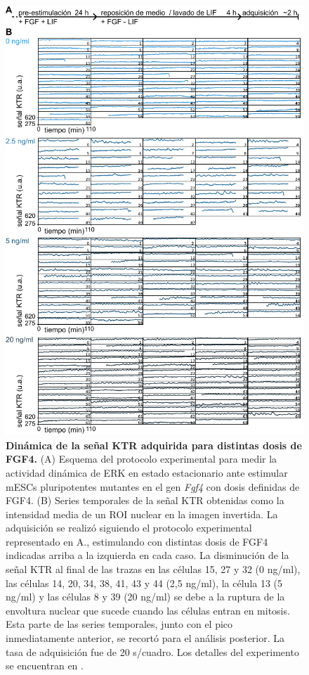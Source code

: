 \documentclass[./main.tex]{subfiles}
\begin{document}
\begin{figure}
    \centering
    \includegraphics[width=1\columnwidth]{figures/chapter3/C3_FGF_traces.pdf} 
    \caption{ \textbf{Dinámica de la señal KTR adquirida para distintas dosis de FGF4.} (A) Esquema del protocolo experimental para medir la actividad dinámica de ERK en estado estacionario ante estimular mESCs pluripotentes mutantes en el gen \textit{Fgf4} con dosis definidas de FGF4. (B) Series temporales de la señal KTR obtenidas como la intensidad media de un ROI nuclear en la imagen invertida. La adquisición se realizó siguiendo el protocolo experimental representado en A., estimulando con distintas dosis de FGF4 indicadas arriba a la izquierda en cada caso. La disminución de la señal KTR al final de las trazas en las células 15, 27 y 32 (0 ng/ml), las células 14, 20, 34, 38, 41, 43 y 44 (2,5 ng/ml), la célula 13 (5 ng/ml) y las células 8 y 39 (20 ng/ml) se debe a la ruptura de la envoltura nuclear que sucede cuando las células entran en mitosis. Esta parte de las series temporales, junto con el pico inmediatamente anterior, se recortó para el análisis posterior. La tasa de adquisición fue de 20 s/cuadro. Los detalles del experimento se encuentran en \cite{Fabris2022}.}
    \label{C3_fig:FGF_traces}
\end{figure}
\end{document}
